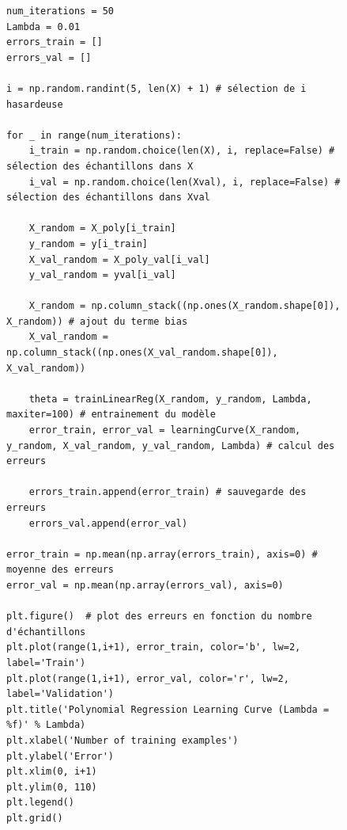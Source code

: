 \begin{figure}[!h]
\begin{verbatim}
num_iterations = 50
Lambda = 0.01
errors_train = []
errors_val = []

i = np.random.randint(5, len(X) + 1) # sélection de i hasardeuse

for _ in range(num_iterations):
    i_train = np.random.choice(len(X), i, replace=False) # sélection des échantillons dans X
    i_val = np.random.choice(len(Xval), i, replace=False) # sélection des échantillons dans Xval
    
    X_random = X_poly[i_train]  
    y_random = y[i_train]
    X_val_random = X_poly_val[i_val] 
    y_val_random = yval[i_val]

    X_random = np.column_stack((np.ones(X_random.shape[0]), X_random)) # ajout du terme bias
    X_val_random = np.column_stack((np.ones(X_val_random.shape[0]), X_val_random))
        
    theta = trainLinearReg(X_random, y_random, Lambda, maxiter=100) # entrainement du modèle
    error_train, error_val = learningCurve(X_random, y_random, X_val_random, y_val_random, Lambda) # calcul des erreurs

    errors_train.append(error_train) # sauvegarde des erreurs
    errors_val.append(error_val)
    
error_train = np.mean(np.array(errors_train), axis=0) # moyenne des erreurs
error_val = np.mean(np.array(errors_val), axis=0)

plt.figure()  # plot des erreurs en fonction du nombre d'échantillons 
plt.plot(range(1,i+1), error_train, color='b', lw=2, label='Train')
plt.plot(range(1,i+1), error_val, color='r', lw=2, label='Validation')
plt.title('Polynomial Regression Learning Curve (Lambda = %f)' % Lambda)
plt.xlabel('Number of training examples')
plt.ylabel('Error')
plt.xlim(0, i+1)
plt.ylim(0, 110)
plt.legend()
plt.grid()
\end{verbatim}   
\end{figure}


